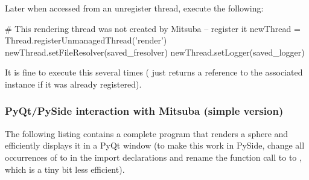 Later when accessed from an unregister thread, execute the following:
\begin{python}
# This rendering thread was not created by Mitsuba -- register it
newThread = Thread.registerUnmanagedThread('render')
newThread.setFileResolver(saved_fresolver)
newThread.setLogger(saved_logger)
\end{python}
It is fine to execute this several times ( just returns
a reference to the associated  instance if it was already registered).

\subsubsection{PyQt/PySide interaction with Mitsuba (simple version)}
The following listing contains a complete program that
renders a sphere and efficiently displays it in a PyQt window
(to make this work in PySide, change all occurrences of  to  in the
import declarations and rename the function call to  to ,
which is a tiny bit less efficient).
